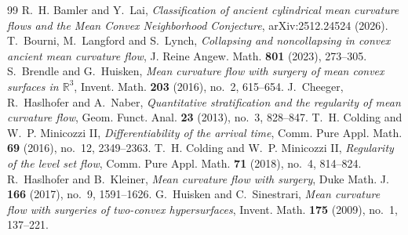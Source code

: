 \documentclass[10pt,a4paper]{amsart}
\newcommand{\IR}{\mathbb{R}}
\numberwithin{equation}{section}
\begin{document}
\begin{thebibliography}{99}
 R.~H. Bamler and Y.~Lai, \emph{Classification of ancient cylindrical mean curvature flows and the Mean Convex Neighborhood Conjecture}, arXiv:2512.24524 (2026).
 T.~Bourni, M.~Langford and S.~Lynch, \emph{Collapsing and noncollapsing in convex ancient mean curvature flow}, J. Reine Angew. Math. \textbf{801} (2023), 273--305.
 S.~Brendle and G.~Huisken, \emph{Mean curvature flow with surgery of mean convex surfaces in $\IR^3$}, Invent. Math. \textbf{203} (2016), no.~2, 615--654.
 J.~Cheeger, R.~Haslhofer and A.~Naber, \emph{Quantitative stratification and the regularity of mean curvature flow}, Geom. Funct. Anal. \textbf{23} (2013), no.~3, 828--847.
 T.~H. Colding and W.~P. Minicozzi II, \emph{Differentiability of the arrival time}, Comm. Pure Appl. Math. \textbf{69} (2016), no.~12, 2349--2363.
 T.~H. Colding and W.~P. Minicozzi II, \emph{Regularity of the level set flow}, Comm. Pure Appl. Math. \textbf{71} (2018), no.~4, 814--824.
 R.~Haslhofer and B.~Kleiner, \emph{Mean curvature flow with surgery}, Duke Math. J. \textbf{166} (2017), no.~9, 1591--1626.
 G.~Huisken and C.~Sinestrari, \emph{Mean curvature flow with surgeries of two-convex hypersurfaces}, Invent. Math. \textbf{175} (2009), no.~1, 137--221.
\end{thebibliography}
\end{document}
